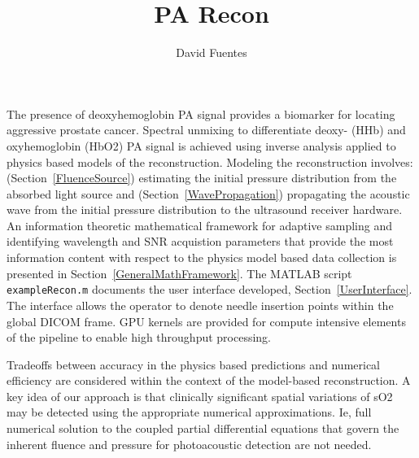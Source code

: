 \documentclass{article}         %
\title{PA Recon}
\author{David Fuentes}
\theoremstyle{definition}
\theoremstyle{remark}
\begin{document}
\maketitle


The presence of deoxyhemoglobin PA signal provides a biomarker for locating
aggressive prostate cancer.  Spectral unmixing to differentiate deoxy- (HHb)
and oxyhemoglobin (HbO2) PA signal is achieved using inverse analysis
applied to physics based models of the reconstruction. 
Modeling the reconstruction involves: (Section~\ref{FluenceSource})
estimating the initial pressure distribution from the absorbed light source
and (Section~\ref{WavePropagation}) propagating the acoustic wave from the
initial pressure distribution to the ultrasound receiver hardware.
An information theoretic mathematical framework for adaptive sampling and 
identifying wavelength and SNR
acquistion parameters that provide the most information content 
with respect to the physics model based data collection
is presented in Section~\ref{GeneralMathFramework}.
The MATLAB script \texttt{exampleRecon.m} documents the user interface
developed, Section~\ref{UserInterface}. 
The interface allows the operator to denote needle insertion
points within the global DICOM frame. GPU kernels are provided
for compute intensive elements of the pipeline to enable high
throughput processing.

%
%

Tradeoffs between accuracy in the physics based predictions and numerical
efficiency are considered within the context of the model-based
reconstruction. A key idea of our approach is that clinically significant
spatial variations of sO2 may be detected using the appropriate numerical
approximations. Ie, full numerical solution to the coupled partial
differential equations that govern the inherent fluence and pressure for
photoacoustic detection are not needed.
\end{document}
